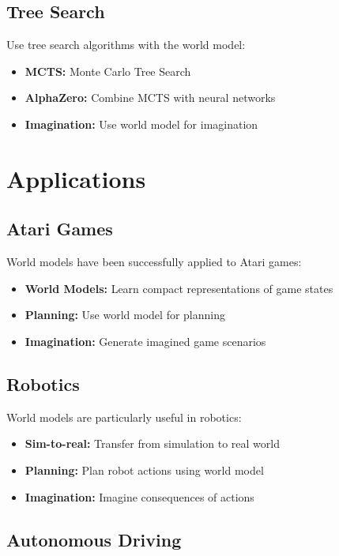 \subsection{Tree Search}

Use tree search algorithms with the world model:
\begin{itemize}
    \item \textbf{MCTS:} Monte Carlo Tree Search
    \item \textbf{AlphaZero:} Combine MCTS with neural networks
    \item \textbf{Imagination:} Use world model for imagination
\end{itemize}

\section{Applications}

\subsection{Atari Games}

World models have been successfully applied to Atari games:
\begin{itemize}
    \item \textbf{World Models:} Learn compact representations of game states
    \item \textbf{Planning:} Use world model for planning
    \item \textbf{Imagination:} Generate imagined game scenarios
\end{itemize}

\subsection{Robotics}

World models are particularly useful in robotics:
\begin{itemize}
    \item \textbf{Sim-to-real:} Transfer from simulation to real world
    \item \textbf{Planning:} Plan robot actions using world model
    \item \textbf{Imagination:} Imagine consequences of actions
\end{itemize}

\subsection{Autonomous Driving}

